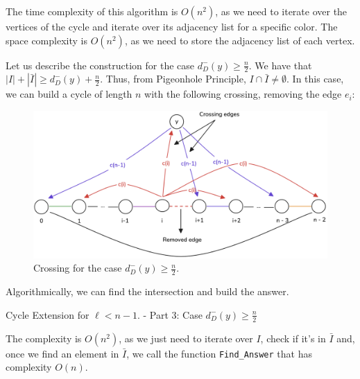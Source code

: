 The time complexity of this algorithm is $O(n^2)$, as we need to iterate over the vertices of the cycle and iterate over 
its adjacency list for a specific color. The space complexity is $O(n^2)$, as we need to store the adjacency list of each vertex.

Let us describe the construction for the case $d^-_D(y) \geq \frac{n}{2}$. We have that 
$|I| + |\bar{I}|  \geq d^-_D(y) +  \frac{n}{2} $. 
Thus, from Pigeonhole Principle, $I \cap \bar{I} \neq \emptyset$. In this case, we can build 
a cycle of length $n$ with the following crossing, removing the edge $e_i$:

\begin{figure}[H]
    \centering
    \includegraphics[width=1\textwidth]{figuras/cycle_n-1_crossing_1.png}
    \caption{Crossing for the case $d^-_D(y) \geq \frac{n}{2}$.}
    \label{fig:crossing_case_2}
\end{figure}

Algorithmically, we can find the intersection and build the answer.

\begin{algorithm}[H]
    \caption{Cycle Extension for \( \ell < n - 1 \). - Part 3: Case \( d^-_D(y) \geq \frac{n}{2} \)}
    \begin{algorithmic}[1]
                    \State \Return {}
                \EndIf
            \EndFor
        \EndFunction
    \end{algorithmic}
\end{algorithm}

The complexity is $O(n^2)$, as we just need to iterate over $I$, check if it's in $\bar{I}$ and, once we find an element in $\bar{I}$, 
we call the function \texttt{Find\_Answer} that has complexity $O(n)$.

